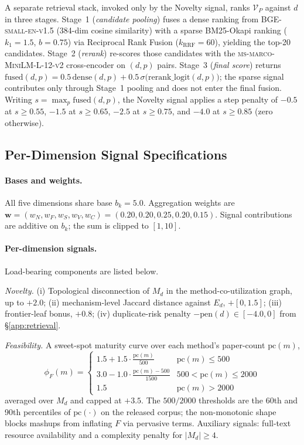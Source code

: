 \documentclass{llmxive}
\begin{document}
A separate retrieval stack, invoked only by the Novelty signal, ranks $\mathcal{V}_P$ against $d$ in three stages.
Stage~1 (\emph{candidate pooling}) fuses a dense ranking from \textsc{BGE-small-en-v1.5} (384-dim cosine
similarity) with a sparse BM25-Okapi ranking ($k_1=1.5$, $b=0.75$) via Reciprocal Rank Fusion
($k_{\text{RRF}}=60$), yielding the top-20 candidates. Stage~2 (\emph{rerank}) re-scores those candidates with the
\textsc{ms-marco-MiniLM-L-12-v2} cross-encoder on $(d, p)$ pairs. Stage~3 (\emph{final score}) returns
$\mathrm{fused}(d,p)=0.5\,\mathrm{dense}(d,p)+0.5\,\sigma\!\big(\mathrm{rerank\_logit}(d,p)\big)$; the sparse
signal contributes only through Stage~1 pooling and does not enter the final fusion. Writing
$s=\max_p\mathrm{fused}(d,p)$, the Novelty signal applies a step penalty of $-0.5$ at $s\!\ge\!0.55$, $-1.5$ at
$s\!\ge\!0.65$, $-2.5$ at $s\!\ge\!0.75$, and $-4.0$ at $s\!\ge\!0.85$ (zero otherwise).


\subsection{Per-Dimension Signal Specifications}
\label{app:eval-signals}

\paragraph{Bases and weights.}
All five dimensions share base $b_k=5.0$. Aggregation weights are
$\mathbf{w}=(w_N,w_F,w_S,w_V,w_C)=(0.20,0.20,0.25,0.20,0.15)$. Signal contributions are additive on $b_k$; the sum
is clipped to $[1,10]$.

\paragraph{Per-dimension signals.}
Load-bearing components are listed below.

\emph{Novelty.} (i) Topological disconnection of $M_d$ in the method-co-utilization graph, up to $+2.0$;
(ii) mechanism-level Jaccard distance against $E_d$, $+[0,1.5]$; (iii) frontier-leaf bonus, $+0.8$;
(iv) duplicate-risk penalty $-\mathrm{pen}(d)\in[-4.0,0]$ from \S\ref{app:retrieval}.

\emph{Feasibility.} A sweet-spot maturity curve over each method's paper-count $\mathrm{pc}(m)$,
\begin{equation*}
\phi_F(m)=
\begin{cases}
1.5+1.5\cdot\tfrac{\mathrm{pc}(m)}{500} & \mathrm{pc}(m)\le500 \\
3.0-1.0\cdot\tfrac{\mathrm{pc}(m)-500}{1500} & 500<\mathrm{pc}(m)\le 2000 \\
1.5 & \mathrm{pc}(m)>2000
\end{cases}
\end{equation*}
averaged over $M_d$ and capped at $+3.5$. The $500/2000$ thresholds are the 60th and 90th percentiles of
$\mathrm{pc}(\cdot)$ on the released corpus; the non-monotonic shape blocks mashups from inflating $F$ via
pervasive terms. Auxiliary signals: full-text resource availability and a complexity penalty for $|M_d|\ge 4$.
\end{document}
